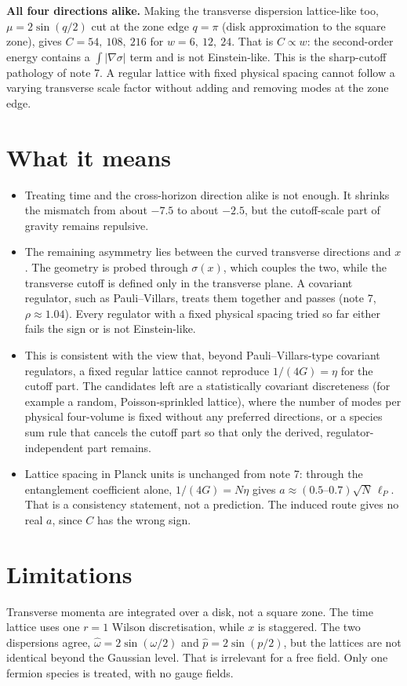 \documentclass[11pt]{article}
\begin{document}
\textbf{All four directions alike.} Making the transverse dispersion lattice-like too, $\mu=2\sin(q/2)$ cut at the zone edge $q=\pi$ (disk approximation to the square zone), gives $C=54,\ 108,\ 216$ for $w=6,\ 12,\ 24$. That is $C\propto w$: the second-order energy contains a $\int|\nabla\sigma|$ term and is not Einstein-like. This is the sharp-cutoff pathology of note 7. A regular lattice with fixed physical spacing cannot follow a varying transverse scale factor without adding and removing modes at the zone edge.

\section{What it means}
\begin{itemize}
\item Treating time and the cross-horizon direction alike is not enough. It shrinks the mismatch from about $-7.5$ to about $-2.5$, but the cutoff-scale part of gravity remains repulsive.
\item The remaining asymmetry lies between the curved transverse directions and $x$. The geometry is probed through $\sigma(x)$, which couples the two, while the transverse cutoff is defined only in the transverse plane. A covariant regulator, such as Pauli--Villars, treats them together and passes (note 7, $\rho\approx1.04$). Every regulator with a fixed physical spacing tried so far either fails the sign or is not Einstein-like.
\item This is consistent with the view that, beyond Pauli--Villars-type covariant regulators, a fixed regular lattice cannot reproduce $1/(4G)=\eta$ for the cutoff part. The candidates left are a statistically covariant discreteness (for example a random, Poisson-sprinkled lattice), where the number of modes per physical four-volume is fixed without any preferred directions, or a species sum rule that cancels the cutoff part so that only the derived, regulator-independent part remains.
\item Lattice spacing in Planck units is unchanged from note 7: through the entanglement coefficient alone, $1/(4G)=N\eta$ gives $a\approx(0.5\text{--}0.7)\sqrt N\,\ell_P$. That is a consistency statement, not a prediction. The induced route gives no real $a$, since $C$ has the wrong sign.
\end{itemize}

\section{Limitations}
Transverse momenta are integrated over a disk, not a square zone. The time lattice uses one $r=1$ Wilson discretisation, while $x$ is staggered. The two dispersions agree, $\hat\omega=2\sin(\omega/2)$ and $\hat p=2\sin(p/2)$, but the lattices are not identical beyond the Gaussian level. That is irrelevant for a free field. Only one fermion species is treated, with no gauge fields.
\end{document}
